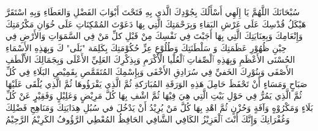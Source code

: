 سُبْحَانَكَ اللَّهُمَّ يَا إِلَهِي أَسْأَلُكَ بِجُوْدِكَ الَّذي بِهِ فَتَحْتَ أَبْوَابَ الفَضْلِ وَالعَطَاءِ وَبِهِ اسْتَقَرَّ هَيْكَلُ قُدْسِكَ عَلَى عَرْشِ البَقاءِ وَبِرَحْمَتِكَ الَّتِي بِهَا دَعَوْتَ المُمْكِنَاتِ عَلَى خُوَانِ مَكْرُمَتِكَ وَإِنْعَامِكَ وَبِعِنَايَتِكَ الَّتِي بِهَا أَجَبْتَ فِي نَفْسِكَ مِنْ قَبْلِ كلِّ مَنْ فِي السَّمَوَاتِ وَالأَرْضِ فِي حِيْنِ ظُهُوْرِ عَظَمَتِكَ وَ سَلْطَنَتِكَ وَطُلُوْعِ عِزِّ حُكُوْمَتِكَ بِكَلِمَة "بَلَى" كَ وَبِهَذِهِ الأَسْمَاءِ الحُسْنَى الأَعْظَمِ وَبِهَذِهِ ٱلْصِّفاتِ ٱلْعُلْيا الْأَكْرَمِ وَبِذِكْرِكَ العَلِيِّ الأَعْلَى وَبِجَمَالِكَ الأَلْطَفِ الأَصْفَى وَبِنُوْرِكَ الخَفيِّ فِي سُرَادِقِ الأَخْفَى وَبِإِسْمِكَ المُتَقَمَّصِ بِقَمِيْصِ البَلَاءِ فِي كُلِّ صَبَاحٍ وَمَسَاءٍ أَنْ تَحْفَظَ حَامِلَ هَذِهِ الوَرَقَةِ المُبَارَكةِ ثُمَّ الَّذِي يَقْرَؤُوهَا ثُمَّ الَّذِي يُلْقَى عَلَيْهَا ثُمَّ الَّذِي يَمُرُّ فِي حَوْلِ بَيْتِ الَّتِي هِيَ فِيْهَا ثُمَّ اشْفِ بِهَا كُلَّ مَرِيْضٍ وَعَلِيْلٍ وَفَقِيْرٍ عَنْ كُلِّ بَلَاءٍ وَمَكْرُوْهٍ وَآفَةٍ وَحُزْنٍ ثُمَّ اهْدِ بِهَا كُلَّ مَنْ يُرِيْدُ أَنْ يَدْخُلَ في سُبُلِ هِدَايَتِكَ وَمَنَاهِجِ فَضْلِكَ وَغُفْرَانِكَ وَإِنَّكَ أَنْتَ ٱلْعَزِيْزُ الكَافِي الشَّافِي الحَافِظُ المُعْطِي الرَّؤُوفُ الكَرِيْمُ الرَّحِيْمُ